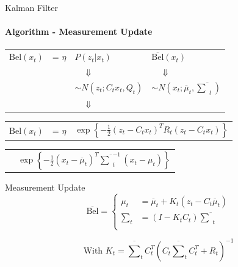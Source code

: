 \documentclass[aspectratio=169]{beamer}
\begin{document}
\begin{frame}[c]{Kalman Filter}
    \framesubtitle{Algorithm -  Measurement Update}
    \begin{tabular}{p{1.5cm} l l l}
        $\text{Bel}(x_t)$  & = $\eta$ & $P(z_t| x_t)$ & $\overline{\text{Bel}}(x_t)$ \\
        & & $\quad \Downarrow$ & $\quad\Downarrow$ \\
        & & $\sim N\left(z_t; C_t x_t, Q_t\right)$ & $\sim N\left(x_t; \overline{\mu}_t, \overline{\textstyle\sum}_t\right)$ \\
        & & $\quad \Downarrow$ &  \\
    \end{tabular}

   \begin{tabular}{p{1.5cm} l l}
        $\text{Bel}(x_t)$  & = $\eta$ & $\exp\left\{  -\displaystyle\frac{1}{2} \left(z_t - C_t x_t\right)^T R_t \left(z_t - C_t x_t\right)  \right\}$ \\
    \end{tabular}
    
    \begin{tabular}{p{2.5cm} l}
        & $\exp\left\{ -\displaystyle\frac{1}{2} \left(x_t - \overline{\mu}_t\right)^T \overline{\textstyle\sum}_t^{-1} \left(x_t - \mu_t\right) \right\}$
    \end{tabular}  

    \begin{block}{Measurement Update}
        \begin{equation}
            \overline{\text{Bel}} = 
            \left\{
            \begin{aligned}
                    \mu_t & = \overline{\mu}_t + K_t(z_t -C_t \overline{\mu}_t)\\
                    \textstyle\sum_t & = (I-K_tC_t)\overline{\textstyle\sum}_t \\
            \end{aligned} \right.
        \end{equation}

        \begin{equation}
            \text{With }
            K_t = \overline{\textstyle\sum}_tC_t^T(C_t\overline{\textstyle\sum}_tC_t^T+R_t)^{-1}
        \end{equation}
    \end{block} 
\end{frame}
\end{document}
